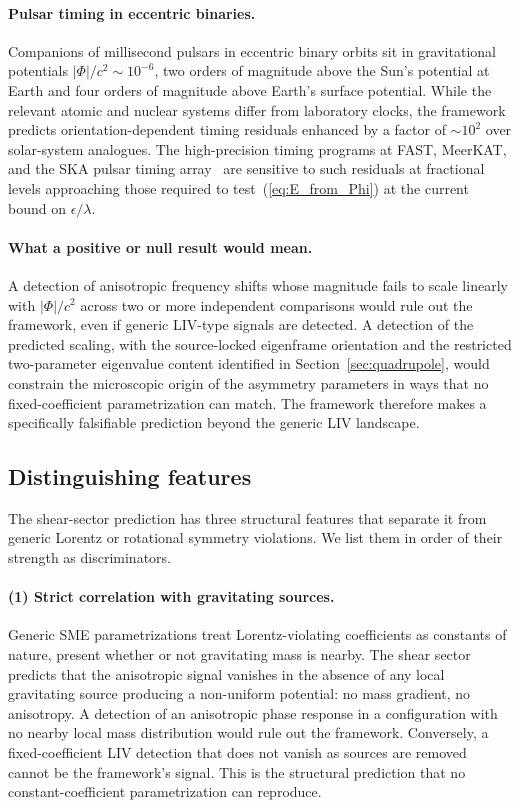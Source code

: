 \documentclass[a4paper,fleqn]{cas-dc}
\theoremstyle{thmstyleone}%
\theoremstyle{thmstyletwo}%
\begin{document}
\paragraph{Pulsar timing in eccentric binaries.}
Companions of millisecond pulsars in eccentric binary orbits
sit in gravitational potentials $|\Phi|/c^2\sim 10^{-6}$, two
orders of magnitude above the Sun's potential at Earth and
four orders of magnitude above Earth's surface potential.
While the relevant atomic and nuclear systems differ from
laboratory clocks, the framework predicts orientation-dependent
timing residuals enhanced by a factor of $\sim 10^2$ over
solar-system analogues. The high-precision timing programs at
FAST, MeerKAT, and the SKA pulsar timing
array~\cite{Kramer2021} are sensitive to such residuals at
fractional levels approaching those required to
test~(\ref{eq:E_from_Phi}) at the current bound on
$\epsilon/\lambda$.

\paragraph{What a positive or null result would mean.}
A detection of anisotropic frequency shifts whose magnitude
fails to scale linearly with $|\Phi|/c^2$ across two or more
independent comparisons would rule out the framework, even if
generic LIV-type signals are detected. A detection of the
predicted scaling, with the source-locked eigenframe
orientation and the restricted two-parameter eigenvalue
content identified in Section~\ref{sec:quadrupole}, would
constrain the microscopic origin of the asymmetry parameters
in ways that no fixed-coefficient parametrization can match.
The framework therefore makes a specifically falsifiable
prediction beyond the generic LIV landscape.

\subsection{Distinguishing features}

The shear-sector prediction has three structural features
that separate it from generic Lorentz or rotational symmetry
violations. We list them in order of their strength as
discriminators.

\paragraph{(1) Strict correlation with gravitating sources.}
Generic SME parametrizations treat Lorentz-violating
coefficients as constants of nature, present whether or not
gravitating mass is nearby. The shear sector predicts that
the anisotropic signal vanishes in the absence of any local 
gravitating source producing a non-uniform potential: no mass 
gradient, no anisotropy. A detection of an anisotropic phase 
response in a configuration with no nearby local mass distribution 
would rule out the framework. Conversely, a fixed-coefficient 
LIV detection that does not vanish as sources are removed cannot 
be the framework's signal. This is the structural prediction that 
no constant-coefficient parametrization can reproduce.
\end{document}
